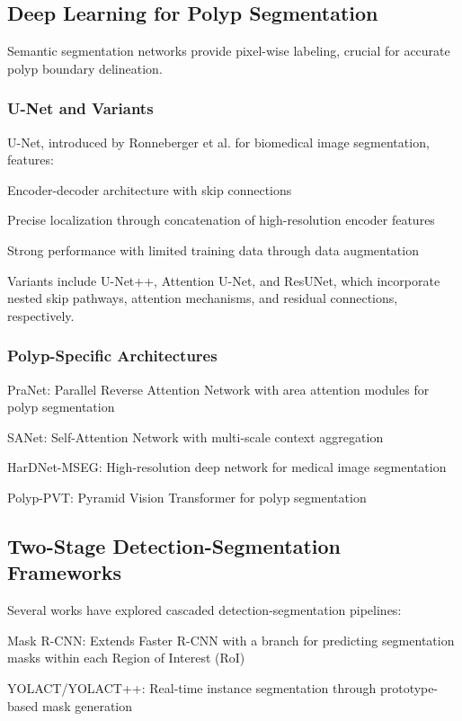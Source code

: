\documentclass[runningheads]{llncs}
\begin{document}
\subsection{Deep Learning for Polyp Segmentation}

Semantic segmentation networks provide pixel-wise labeling, crucial for accurate polyp boundary delineation.

\subsubsection{U-Net and Variants}
U-Net, introduced by Ronneberger et al. for biomedical image segmentation, features:

\noindent Encoder-decoder architecture with skip connections

\noindent Precise localization through concatenation of high-resolution encoder features

\noindent Strong performance with limited training data through data augmentation

Variants include U-Net++, Attention U-Net, and ResUNet, which incorporate nested skip pathways, attention mechanisms, and residual connections, respectively.

\subsubsection{Polyp-Specific Architectures}
\noindent PraNet: Parallel Reverse Attention Network with area attention modules for polyp segmentation

\noindent SANet: Self-Attention Network with multi-scale context aggregation

\noindent HarDNet-MSEG: High-resolution deep network for medical image segmentation

\noindent Polyp-PVT: Pyramid Vision Transformer for polyp segmentation

\subsection{Two-Stage Detection-Segmentation Frameworks}

Several works have explored cascaded detection-segmentation pipelines:

\noindent Mask R-CNN: Extends Faster R-CNN with a branch for predicting segmentation masks within each Region of Interest (RoI)

\noindent YOLACT/YOLACT++: Real-time instance segmentation through prototype-based mask generation
\end{document}

